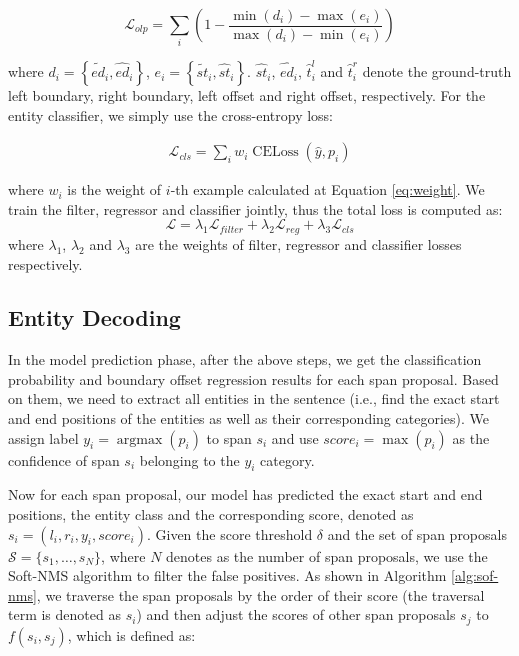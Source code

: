 \documentclass[11pt,a4paper]{article}
\begin{document}
\begin{equation}
\mathcal{L}_{olp}=\sum_i \left(1- \frac{\min\left(d_i\right) - \max\left(e_i\right) }{\max \left(d_i\right) - \min\left(e_i\right)}\right)
\end{equation}

\noindent where $d_i =  \left\{\widetilde{ed}_i,\hat{ed}_i\right\}$, $e_i=\left\{\widetilde{st}_i, \hat{st}_i\right\}$. $\hat{st}_i$, $\hat{ed}_i$, $\hat{t}_i^{l}$ and $\hat{t}_i^{r}$ denote the ground-truth left boundary, right boundary, left offset and right offset, respectively. For the entity classifier, we simply use the cross-entropy loss:







\begin{equation}
    \begin{aligned}
    \mathcal{L}_{cls} = \sum_i w_i\operatorname{CELoss}(\hat{y}, p_i)
    \end{aligned}
\end{equation}

\noindent where $w_i$ is the weight of $i$-th example calculated at Equation \ref{eq:weight}. We train the filter, regressor and classifier jointly, thus the total loss is computed as:
\begin{equation}
\mathcal{L} = \lambda_1 \mathcal{L}_{filter}+ \lambda_2 \mathcal{L}_{reg} +\lambda_3 \mathcal{L}_{cls}
\end{equation}
where $\lambda_1$, $\lambda_2$ and $\lambda_3$ are the weights of filter, regressor and classifier losses respectively.

\subsection{Entity Decoding}

In the model prediction phase, after the above steps, we get the classification probability and boundary offset regression results for each span proposal. Based on them, we need to extract all entities in the sentence (i.e., find the exact start and end positions of the entities as well as their corresponding categories). We assign label $y_i = \operatorname{argmax}(p_i)$ to span $s_i$ and use $score_i = \operatorname{max}(p_i)$ as the confidence of span $s_i$ belonging to the $y_i$ category.


Now for each span proposal, our model has predicted the exact start and end positions, the entity class and the corresponding score, denoted as $s_i=(l_i,r_i,y_i,score_i)$. Given the score threshold $\delta$ and the set of span proposals  $\mathcal{S} = \{s_1,\dots,s_N\}$, where $N$ denotes as the number of span proposals, we use the Soft-NMS \citep{8237855} algorithm to filter the false positives. As shown in Algorithm \ref{alg:sof-nms}, we traverse the span proposals by the order of their score 
(the traversal term is denoted as $s_i$) and then adjust the scores of other span proposals $s_j$ to $f(s_i,s_j)$, which is defined as:
\end{document}

